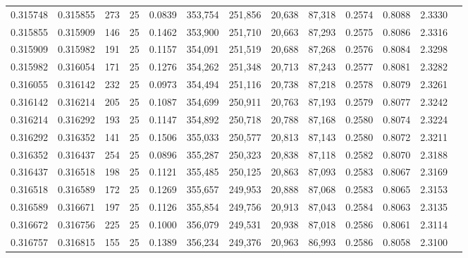 \begin{tabular}{rrrrrrrrrrrrr}
0.315748 & 0.315855 &   273 &  25 &                                     0.0839 & 353,754 & 251,856 &  20,638 &  87,318 & 0.2574 & 0.8088 & 2.3330 \\
0.315855 & 0.315909 &   146 &  25 &                                     0.1462 & 353,900 & 251,710 &  20,663 &  87,293 & 0.2575 & 0.8086 & 2.3316 \\
0.315909 & 0.315982 &   191 &  25 &                                     0.1157 & 354,091 & 251,519 &  20,688 &  87,268 & 0.2576 & 0.8084 & 2.3298 \\
0.315982 & 0.316054 &   171 &  25 &                                     0.1276 & 354,262 & 251,348 &  20,713 &  87,243 & 0.2577 & 0.8081 & 2.3282 \\
0.316055 & 0.316142 &   232 &  25 &                                     0.0973 & 354,494 & 251,116 &  20,738 &  87,218 & 0.2578 & 0.8079 & 2.3261 \\
0.316142 & 0.316214 &   205 &  25 &                                     0.1087 & 354,699 & 250,911 &  20,763 &  87,193 & 0.2579 & 0.8077 & 2.3242 \\
0.316214 & 0.316292 &   193 &  25 &                                     0.1147 & 354,892 & 250,718 &  20,788 &  87,168 & 0.2580 & 0.8074 & 2.3224 \\
0.316292 & 0.316352 &   141 &  25 &                                     0.1506 & 355,033 & 250,577 &  20,813 &  87,143 & 0.2580 & 0.8072 & 2.3211 \\
0.316352 & 0.316437 &   254 &  25 &                                     0.0896 & 355,287 & 250,323 &  20,838 &  87,118 & 0.2582 & 0.8070 & 2.3188 \\
0.316437 & 0.316518 &   198 &  25 &                                     0.1121 & 355,485 & 250,125 &  20,863 &  87,093 & 0.2583 & 0.8067 & 2.3169 \\
0.316518 & 0.316589 &   172 &  25 &                                     0.1269 & 355,657 & 249,953 &  20,888 &  87,068 & 0.2583 & 0.8065 & 2.3153 \\
0.316589 & 0.316671 &   197 &  25 &                                     0.1126 & 355,854 & 249,756 &  20,913 &  87,043 & 0.2584 & 0.8063 & 2.3135 \\
0.316672 & 0.316756 &   225 &  25 &                                     0.1000 & 356,079 & 249,531 &  20,938 &  87,018 & 0.2586 & 0.8061 & 2.3114 \\
0.316757 & 0.316815 &   155 &  25 &                                     0.1389 & 356,234 & 249,376 &  20,963 &  86,993 & 0.2586 & 0.8058 & 2.3100 \\

\end{tabular}
